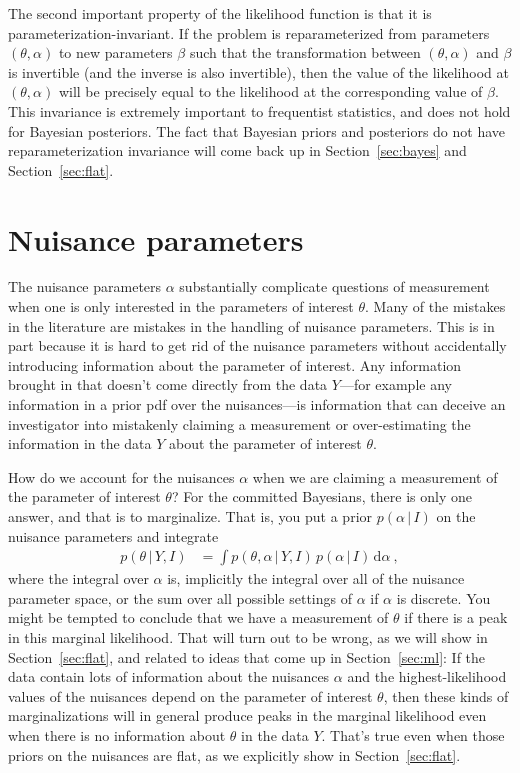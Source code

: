 \documentclass{article}
\newcommand{\sectionname}{Section}
\newcommand{\secref}[1]{\sectionname~\ref{#1}}
\newcommand{\dd}{\mathrm{d}}
\newcommand{\given}{\,|\,}
\begin{document}
The second important property of the likelihood function is that it is par\-am\-e\-ter\-i\-za\-tion-invariant.
If the problem is reparameterized from parameters $(\theta,\alpha)$ to new parameters $\beta$ such that the transformation between $(\theta,\alpha)$ and $\beta$ is invertible (and the inverse is also invertible), then the value of the likelihood at $(\theta,\alpha)$ will be precisely equal to the likelihood at the corresponding value of $\beta$.
This invariance is extremely important to frequentist statistics, and does not hold for Bayesian posteriors.
The fact that Bayesian priors and posteriors do not have reparameterization invariance will come back up in \secref{sec:bayes} and \secref{sec:flat}.

\section{Nuisance parameters}\label{sec:nuisance}
The nuisance parameters $\alpha$ substantially complicate questions of measurement when one is only interested in the parameters of interest $\theta$.
Many of the mistakes in the literature are mistakes in the handling of nuisance parameters.
This is in part because it is hard to get rid of the nuisance parameters without accidentally introducing information about the parameter of interest.
Any information brought in that doesn't come directly from the data $Y$---for example any information in a prior pdf over the nuisances---is information that can deceive an investigator into mistakenly claiming a measurement or over-estimating the information in the data $Y$ about the parameter of interest $\theta$.

How do we account for the nuisances $\alpha$ when we are claiming a measurement of the parameter of interest $\theta$?
For the committed Bayesians, there is only one answer, and that is to marginalize.
That is, you put a prior $p(\alpha\given I)$ on the nuisance parameters and integrate
\begin{align}
    p(\theta\given Y,I) &= \int p(\theta,\alpha\given Y,I)\,p(\alpha\given I)\,\dd\alpha ~,\label{eq:marginallf}
\end{align}
where the integral over $\alpha$ is, implicitly the integral over all of the nuisance parameter space, or the sum over all possible settings of $\alpha$ if $\alpha$ is discrete.
You might be tempted to conclude that we have a measurement of $\theta$ if there is a peak in this marginal likelihood.
That will turn out to be wrong, as we will show in \secref{sec:flat}, and related to ideas that come up in \secref{sec:ml}:
If the data contain lots of information about the nuisances $\alpha$ and the highest-likelihood values of the nuisances depend on the parameter of interest $\theta$, then these kinds of marginalizations will in general produce peaks in the marginal likelihood even when there is no information about $\theta$ in the data $Y$.
That's true even when those priors on the nuisances are flat, as we explicitly show in \secref{sec:flat}.
\end{document}
